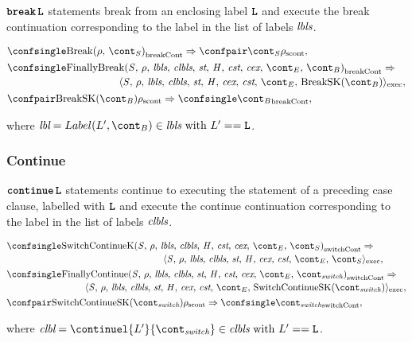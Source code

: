 \documentclass[a4paper,oneside,fleqn]{article}
\newcommand{\synt}[1]{\ensuremath{\text{\textbf{\texttt{#1}}}}}
\DeclareMathOperator{\bbreak}{\synt{break}}
\DeclareMathOperator{\continue}{\synt{continue}}
\newcommand{\cesktrans}[2]{\ensuremath{{#1} \Rightarrow {#2}}}
\newcommand{\cesktranssplit}[2]{\ensuremath{{#1} \Rightarrow\\ {#2}}}
\begin{document}
$\bbreak \synt{L}$ statements break from an enclosing label $\synt{L}$ and execute the break continuation corresponding to the label in the list of labels $\textit{lbls}$.

\begin{align*}
    &\cesktrans%
        {\breakconf{\Break{\env}{\scont}}}%
        {\scontconf{\scont}{\env}},\\
    &\begin{multlined}
        \cesktranssplit%
            {\breakconf{\FinallyBreak{\stmt}{\bcont}}}%
            {\execconf{\stmt}{\env}{\lbls}{\clbls}{\strace}{\handler}{\cex,\,\cstrace}{\econt}{\mathrm{BreakSK}(\bcont)}},
    \end{multlined}\\
    &\cesktrans%
        {\scontconf{\mathrm{BreakSK}(\bcont)}{\env}}%
        {\breakconf{\bcont}},
\end{align*}

\noindent where $\lbl = Label(L', \bcont) \in \lbls \text{ with } L' == \synt{L}$.


\subsubsection{Continue}

$\continue \synt{L}$ statements continue to executing the statement of a preceding case clause, labelled with $\synt{L}$ and execute the continue continuation corresponding to the label in the list of labels $\textit{clbls}$.

\begin{align*}
    &\begin{multlined}
        \cesktranssplit%
            {\switchconf{\ContinueK}}%
            {\execconf{\stmt}{\env}{\lbls}{\clbls}{\strace}{\handler}{\cex,\,\cstrace}{\econt}{\scont}},
    \end{multlined}\\
    &\begin{multlined}
        \cesktranssplit%
            {\switchconf{\FinallyContinue{\stmt}{\switchcont}}}%
            {\execconf{\stmt}{\env}{\lbls}{\clbls}{\strace}{\handler}{\cex,\,\cstrace}{\econt}{\mathrm{SwitchContinueSK}(\switchcont)}},
    \end{multlined}\\
    &\cesktrans%
        {\scontconf{\mathrm{SwitchContinueSK}(\switchcont)}{\env}}%
        {\switchconf{\switchcont}},
\end{align*}

\noindent where $\clbl = \continuel{L'}{\switchcont} \in \clbls \text{ with } L' == \synt{L}$.
\end{document}

